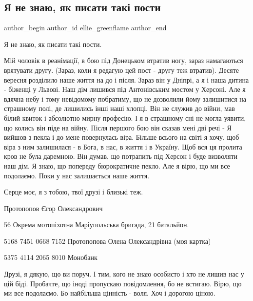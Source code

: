  
 
 
 
 
 
\subsection{Я не знаю, як писати такі пости}
\label{sec:12_09_2022.fb.ellie_greenflame.1.mij_cholovik_reanimacia}
 
\ifcmt
 author_begin
   author_id ellie_greenflame
 author_end
\fi

Я не знаю, як писати такі пости.

Мій чоловік в реанімації, в бою під Донецьком втратив ногу, зараз намагаються
врятувати другу. (Зараз, коли я редагую цей пост - другу теж втратив). Десяте
вересня розділило наше життя на до і після. Зараз він у Дніпрі, а я і наша
дитина - біженці у Львові. Наш дім лишився під Антонівським мостом у Херсоні.
Але я вдячна небу і тому невідомому побратиму, що не дозволили йому залишитися
на  страшному полі, де лишились інші наші хлопці. Він не служив до війни, мав
білий квиток і абсолютно мирну професію. І я в страшному сні не могла уявити,
що колись він піде на війну. Після першого бою він сказав мені дві речі - Я
вийшов з пекла і до мене повернулась віра. Більше всього на світі я хочу, щоб
віра з ним залишилася - в Бога, в нас, в життя і в Україну. Щоб вся ця пролита
кров не була даремною. Він думав, що потрапить під Херсон і буде визволяти наш
дім. Я знаю, що попереду бюрократичне пекло. Але я вірю, що ми все подолаємо.
Поки у нас залишається наше життя. 

Серце моє, я з тобою, твої друзі і близькі теж. 

Протопопов Єгор Олександрович

56 Окрема мотопіхотна Маріупольська бригада, 21 батальйон.

5168 7451 0668 7152 Протопопова Олена Олександрівна (моя картка) 

5375 4114 2065 8010 Монобанк

Друзі, я дякую, що ви поруч. І тим, кого не знаю особисто і хто не лишив нас у
цій біді. Пробачте, що іноді пропускаю повідомлення, бо не встигаю. Вірю, що ми
все подолаємо. Бо найбільша цінність - воля. Хоч і дорогою ціною.
